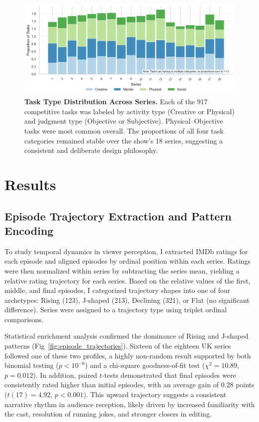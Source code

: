 \documentclass[10pt,letterpaper]{article}
\begin{document}
\begin{figure}[!h]
\centering
\includegraphics[width=\linewidth]{figures/main/Fig5.png}
\caption{{\bf Task Type Distribution Across Series.}
Each of the 917 competitive tasks was labeled by activity type (Creative or Physical) and judgment type (Objective or Subjective). Physical–Objective tasks were most common overall. The proportions of all four task categories remained stable over the show’s 18 series, suggesting a consistent and deliberate design philosophy.}
\label{fig:task_format}
\end{figure}
\FloatBarrier





\section*{Results}


\subsection*{Episode Trajectory Extraction and Pattern Encoding}

To study temporal dynamics in viewer perception, I extracted IMDb ratings for each episode and aligned episodes by ordinal position within each series. Ratings were then normalized within series by subtracting the series mean, yielding a relative rating trajectory for each series. Based on the relative values of the first, middle, and final episodes, I categorized trajectory shapes into one of four archetypes: Rising (123), J-shaped (213), Declining (321), or Flat (no significant difference). Series were assigned to a trajectory type using triplet ordinal comparisons.

Statistical enrichment analysis confirmed the dominance of Rising and J-shaped patterns (Fig~\ref{fig:episode_trajectories}). Sixteen of the eighteen UK series followed one of these two profiles, a highly non-random result supported by both binomial testing ($p < 10^{-6}$) and a chi-square goodness-of-fit test ($\chi^2 = 10.89$, $p = 0.012$). In addition, paired $t$-tests demonstrated that final episodes were consistently rated higher than initial episodes, with an average gain of 0.28 points ($t(17) = 4.92$, $p < 0.001$). This upward trajectory suggests a consistent narrative rhythm in audience reception, likely driven by increased familiarity with the cast, resolution of running jokes, and stronger closers in editing.
\end{document}
